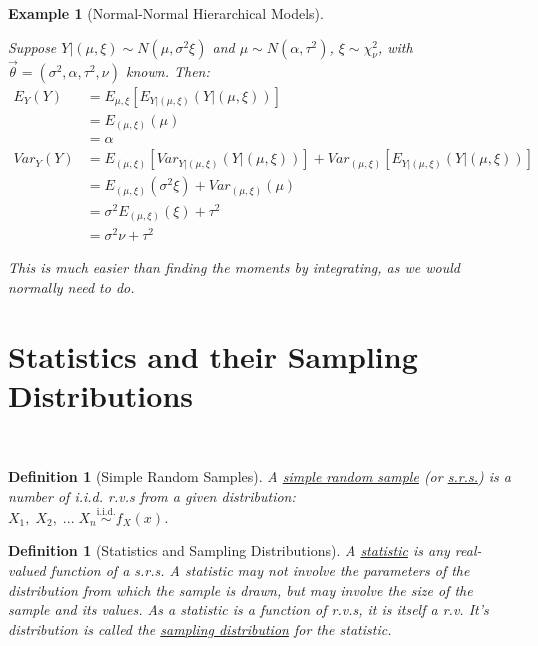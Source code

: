 \documentclass[12pt,a4paper]{article}
\newtheorem{defn}[thm]{Definition}
\newtheorem{ex}[thm]{Example}
\begin{document}
\begin{ex}[Normal-Normal Hierarchical Models]$\quad$\par\vspace{1cm}

Suppose $Y|(\mu,\xi) \sim N(\mu,\sigma^2\xi)$ and $\mu \sim N(\alpha,\tau^2)$, $\xi \sim \chi^2_\nu$, with $\vec{\theta} = (\sigma^2, \alpha, \tau^2, \nu)$ known. Then:
\begin{align*}
E_Y(Y) &= E_{\mu,\xi}[E_{Y|(\mu,\xi)}(Y|(\mu,\xi))]\\
&= E_{(\mu,\xi)}(\mu)\\
&= \alpha\\
Var_Y(Y) &= E_{(\mu,\xi)}[Var_{Y|(\mu,\xi)}(Y|(\mu,\xi))] + Var_{(\mu,\xi)}[E_{Y|(\mu,\xi)}(Y|(\mu,\xi))]\\
&= E_{(\mu,\xi)}(\sigma^2\xi) + Var_{(\mu,\xi)}(\mu)\\
&= \sigma^2E_{(\mu,\xi)}(\xi) + \tau^2\\
&= \sigma^2\nu + \tau^2
\end{align*}

This is much easier than finding the moments by integrating, as we would normally need to do.

\end{ex}

\clearpage
\section{Statistics and their Sampling Distributions}$\;$

\begin{defn}[Simple Random Samples]\vspace{1cm}

A \underline{simple random sample} (or \underline{s.r.s.}) is a number of i.i.d. r.v.s from a given distribution:\\ $X_1,\;X_2,\; ...\; X_n \overset{\text{i.i.d.}}{\sim} f_X(x)$.
\end{defn}

\begin{defn}[Statistics and Sampling Distributions]\vspace{1cm}

A \underline{statistic} is any real-valued function of a s.r.s. A statistic may not involve the parameters of the distribution from which the sample is drawn, but may involve the size of the sample and its values. As a statistic is a function of r.v.s, it is itself a r.v. It's distribution is called the \underline{sampling distribution} for the statistic.

\end{defn}
\end{document}
